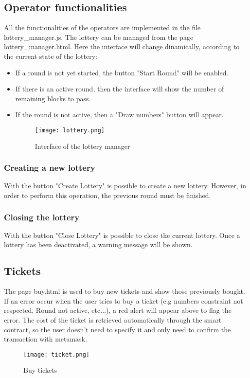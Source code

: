 \documentclass[11pt]{article}
\begin{document}
\subsection{Operator functionalities}
All the functionalities of the operators are implemented in the file lottery\_manager.js.
The lottery can be managed from the page lottery\_manager.html.
Here the interface will change dinamically, according to the current state of the lottery:
\begin{itemize}

\item If a round is not yet started, the button "Start Round" will be enabled.
\item If there is an active round, then the interface will show the number of remaining blocks to pass.
\item If the round is not active, then a "Draw numbers" button will appear.
\begin{figure}
\texttt{[image: lottery.png]}
\caption{Interface of the lottery manager}
\end{figure}

\end{itemize}
\subsubsection*{Creating a new lottery}
With the button "Create Lottery" is possible to create a new lottery. However, in order to perform this operation,
the previous round must be finished.

\subsubsection*{Closing the lottery}
With the button "Close Lottery" is possible to close the current lottery. Once a lottery has been deactivated,
 a warning message will be shown.

\subsection{Tickets}
The page buy.html is used to buy new tickets and show those previously bought. If an error occur when the user tries to buy a
ticket (e.g numbers constraint not respected, Round not active, etc...), a red alert will appear above to flag the error.
The cost of the ticket is retrieved automatically through the smart contract, so the user doesn't need to specify it and
only need to confirm the transaction with metamask.
\begin{figure}[h!]
\centering
\texttt{[image: ticket.png]}
\caption{Buy tickets}
\label{fig:buy}
\end{figure}
\end{document}
